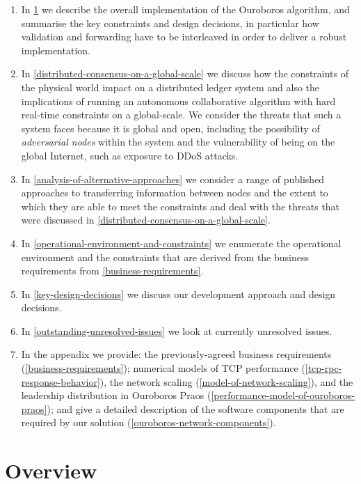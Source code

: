 \documentclass[11pt,a4paper]{article}
\begin{document}
\begin{enumerate}
\item
  In \cref{overview} we describe the overall
  implementation of the Ouroboros algorithm, and summarise the key
  constraints and design decisions, in particular how validation and
  forwarding have to be interleaved in order to deliver a robust
  implementation.
\item
  In \cref{distributed-consensus-on-a-global-scale} we discuss how the
  constraints of the physical world impact on a distributed ledger
  system and also the implications of running an autonomous
  collaborative algorithm with hard real-time constraints on a
  global-scale. We consider the threats that such a system faces because
  it is global and open, including the possibility of \emph{adversarial
  nodes} within the system and the vulnerability of being on the global
  Internet, such as exposure to DDoS attacks.
\item
  In \cref{analysis-of-alternative-approaches} we consider a range of
  published approaches to transferring information between nodes and the
  extent to which they are able to meet the constraints and deal with
  the threats that were discussed in
  \cref{distributed-consensus-on-a-global-scale}.
\item
  In \cref{operational-environment-and-constraints} we enumerate the
  operational environment and the constraints that are derived from the
  business requirements from \cref{business-requirements}.
\item
  In \cref{key-design-decisions} we discuss our development
  approach and design decisions.
\item
  In \cref{outstanding-unresolved-issues} we look at currently
  unresolved issues.
\item
  In the appendix we provide: the previously-agreed business
  requirements (\cref{business-requirements}); numerical models of TCP
  performance (\cref{tcp-rpc-response-behavior}), the network scaling
  (\cref{model-of-network-scaling}), and the leadership distribution in
  Ouroboros Praos (\cref{performance-model-of-ouroboros-praos}); and
  give a detailed description of the software components that are
  required by our solution (\cref{ouroboros-network-components}).
\end{enumerate}

\section{Overview}
\label{overview}
\end{document}

